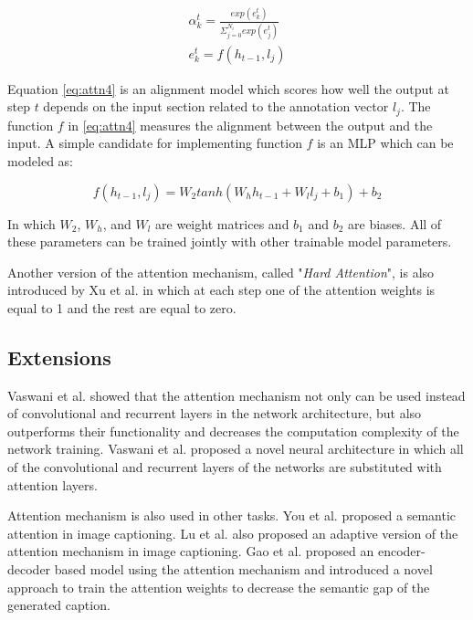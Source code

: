 \documentclass[preprint, 12pt]{elsarticle}
\begin{document}
		\begin{align}
			\alpha_k^t = \frac{exp(e_k^t)}{\Sigma_{j=0}^{N_i} exp(e_j^t)} \label{eq:attn3}\\
			e_k^t = f(h_{t-1}, l_j) \label{eq:attn4}
		\end{align}
		
		Equation \eqref{eq:attn4} is an alignment model which scores how well the output at step $t$ depends on the input section related to the annotation vector $l_j$. The function $f$ in \eqref{eq:attn4} measures the alignment between the output and the input. A simple candidate for implementing function $f$ is an MLP which can be modeled as:
		
		\begin{equation}
			f(h_{t-1}, l_j) = W_2 tanh(W_h h_{t-1} + W_l l_{j} + b_1) + b_2
		\end{equation}
		
		In which $W_2$, $W_h$, and $W_l$ are weight matrices and $b_1$ and $b_2$ are biases. All of these parameters can be trained jointly with other trainable model parameters.
		
		Another version of the attention mechanism, called "\textit{Hard Attention}", is also introduced by Xu et al. \cite{xu2015show} in which at each step one of the attention weights is equal to 1 and the rest are equal to zero. 
		
		\subsection{Extensions}
		Vaswani et al. \cite{vaswani2017attention} showed that the attention mechanism not only can be used instead of convolutional and recurrent layers in the network architecture, but also outperforms their functionality and decreases the computation complexity of the network training. Vaswani et al. \cite{vaswani2017attention} proposed a novel neural architecture in which all of the convolutional and recurrent layers of the networks are substituted with attention layers.
		
		Attention mechanism is also used in other tasks. You et al. \cite{you2016image} proposed a semantic attention in image captioning. Lu et al. \cite{lu2017knowing} also proposed an adaptive version of the attention mechanism in image captioning. Gao et al. \cite{gao2017video} proposed an encoder-decoder based model using the attention mechanism and introduced a novel approach to train the attention weights to decrease the semantic gap of the generated caption. 
		
\end{document}
